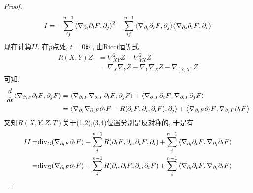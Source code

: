 \begin{proof}
\begin{equation}
\begin{split}
            I&=-\sum_{ij}^{n-1}{\left < \nabla_{{\partial_i}}{\partial_t F}, {\partial_j} \right >}^2-\sum_{ij}^{n-1}{\left < \nabla_{{\partial_i}}{\partial_t F}, {\partial_j} \right >}{\left < \nabla_{{\partial_j}}{\partial_t F}, {\partial_i} \right >} \\
        \end{split}
    \end{equation}
    现在计算$II$. 在$p$点处, $t=0$时, 由Ricci恒等式
    \begin{equation}
        \begin{split}
            R(X,Y)Z&=\nabla^2_{XY}Z-\nabla^2_{YX}Z\\
            &=\nabla_X\nabla_YZ-\nabla_Y\nabla_XZ-\nabla_{\left[Y,X \right]}Z
        \end{split}
    \end{equation}
    可知,
    \begin{equation}
        \begin{split}
            \frac{d}{dt} {\left < \nabla_{{\partial_i F}}{\partial_t F}, {\partial_j F} \right >} &= {\left < \nabla_{{\partial_t F}}\nabla_{{\partial_i F}}{\partial_t F}, {\partial_j F} \right >} + {\left < \nabla_{{\partial_i F}}{\partial_t F}, \nabla_{{\partial_t F}}{\partial_j F} \right >} \\
            &={\left < \nabla_{{\partial_i}}\nabla_{{\partial_t F}}{\partial_t F}-R({\partial_t F},{\partial_i},{\partial_t F}), {\partial_j} \right >} + {\left < \nabla_{{\partial_i F}}{\partial_t F}, \nabla_{{\partial_j F}}{\partial_t F} \right >}
        \end{split}
    \end{equation}
    又知$R(X,Y,Z,T)$关于(1,2),(3,4)位置分别是反对称的, 于是有
    \begin{equation}
        \begin{split}
            II=&\div_\Sigma(\nabla_{\PTF}\PTF) -\sum_{i}^{n-1}R(\PTF,\PI,\PTF,\PI) + \sum_{i}^{n-1}\inner{\nabla_{\PI}\PTF}{\nabla_{\PI}\PTF} \\
            =&\div_\Sigma(\nabla_{\PTF}\PTF) -\sum_{i}^{n-1}R(\PI,\PTF,\PI,\PTF) + \sum_{i}^{n-1}\inner{\nabla_{\PI}\PTF}{\nabla_{\PI}\PTF}

\end{split}
\end{equation}
\end{proof}
